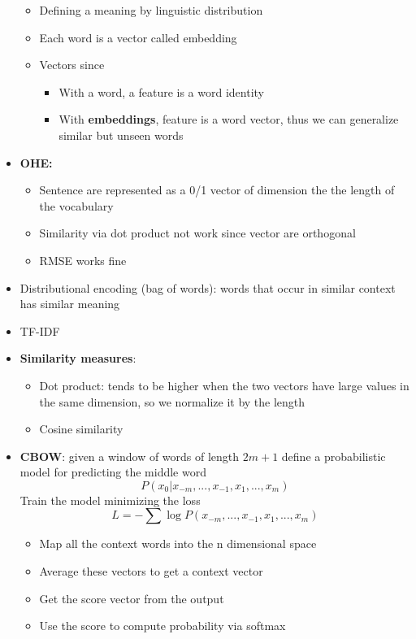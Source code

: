 \begin{itemize}
\begin{itemize}
        \item Defining a meaning by linguistic distribution
        \item Each word is a vector called embedding
        \item Vectors since
        \begin{itemize}
            \item With a word, a feature is a word identity
            \item With \textbf{embeddings}, feature is a word vector, thus we can generalize similar but unseen words
        \end{itemize}
    \end{itemize}
    \item \textbf{OHE:} 
    \begin{itemize}
        \item Sentence are represented as a 0/1 vector of dimension the the length of the vocabulary
        \item Similarity via dot product not work since vector are orthogonal
        \item RMSE works fine
    \end{itemize}
    \item Distributional encoding (bag of words): words that occur in similar context has similar meaning
    \item TF-IDF
    \item \textbf{Similarity measures}:
    \begin{itemize}
        \item Dot product: tends to be higher when the two vectors have large values in the same dimension, so we normalize it by the length
        \item Cosine similarity
    \end{itemize}
    \item \textbf{CBOW}: given a window of words of length \(2m + 1\) define a probabilistic model for predicting the middle word
    \[P(x_0 | x_{-m},..., x_{-1}, x_1, ..., x_m)\]
    Train the model minimizing the loss
    \[L = - \sum \log P(x_{-m},..., x_{-1}, x_1, ..., x_m)\]
    \begin{itemize}
        \item Map all the context words into the n dimensional space
        \item Average these vectors to get a context vector
        \item Get the score vector from the output
        \item Use the score to compute probability via softmax

\end{itemize}
\end{itemize}
